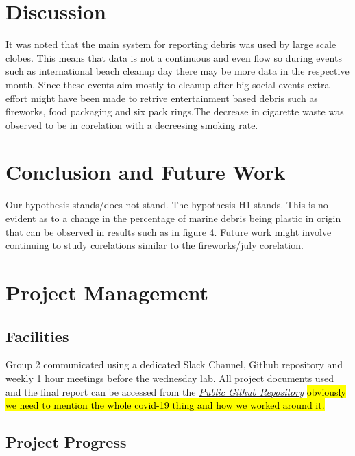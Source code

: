 \documentclass[10pt]{article}\usepackage[]{graphicx}\usepackage[]{color}
\begin{document}
\pagebreak
\section{Discussion}

It was noted that the main system for reporting debris was used by large scale clobes. This means that data is not a continuous and even flow so during events such as international beach cleanup day there may be more data in the respective month. Since these events aim mostly to cleanup after big social events extra effort might have been made to retrive entertainment based debris such as fireworks, food packaging and six pack rings.The decrease in cigarette waste was observed to be in corelation with a decreesing smoking rate.


\section{Conclusion and Future Work}\label{cdsmote1}

Our hypothesis stands/does not stand.
The hypothesis H1 stands. This is no evident as to a change in the percentage of marine debris being plastic in origin that can be observed in results such as in figure 4.  
Future work might involve continuing to study corelations similar to the fireworks/july corelation.  







\pagebreak
\section{Project Management}\label{mgt}
\subsection{Facilities}
Group 2 communicated using a dedicated Slack Channel, Github repository and weekly 1 hour meetings before the wednesday lab.
All project documents used and the final report can be accessed from the \textit{\href{https://github.com/KarenJewell/CMM507Group2}{Public Github Repository}}
\hl{obviously we need to mention the whole covid-19 thing and how we worked around it.}

\subsection{Project Progress}
\end{document}
